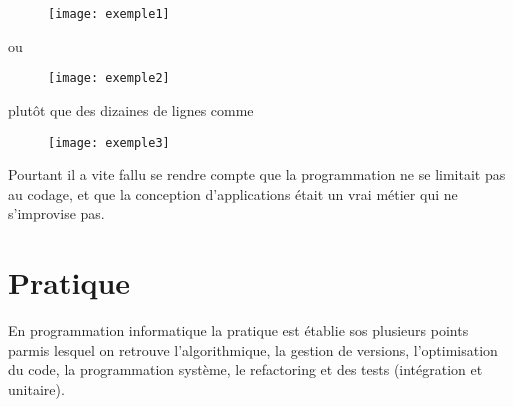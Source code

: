 \documentclass[12pt,a4paper]{article}
\begin{document}
    
    \begin{center}
        \begin{figure}[ht]
            \centering
             \texttt{[image: exemple1]}
        \end{figure}
        
      ou
      
    
    \newpage
    
    
        \begin{figure}[ht]
            \centering
            \texttt{[image: exemple2]}
        \end{figure}  
        
        plutôt que des dizaines de lignes comme\\
        
        \begin{figure}[ht]
            \centering
            \texttt{[image: exemple3]}
        \end{figure}
    \end{center}
    
    
    Pourtant il a vite fallu se rendre compte que la programmation ne se limitait pas au codage, et que la conception d'applications était un vrai métier qui ne s'improvise pas.\\
   
    
    \section{\label{pr}Pratique}
    En programmation informatique la pratique est établie sos plusieurs points parmis lesquel on retrouve l'algorithmique, la gestion de versions, l'optimisation du code, la programmation système, le refactoring et des tests (intégration et unitaire).
    
    
\end{document}
